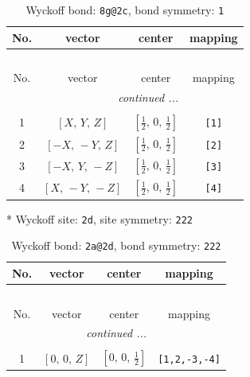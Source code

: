 \documentclass[fleqn,8pt]{jsarticle}
\begin{document}
\begin{longtable}{cccc}
\caption{Wyckoff bond: {\tt 8g@2c}, bond symmetry: {\tt 1}}
 \\
 \hline \hline
No. & vector & center & mapping \\ \hline \endfirsthead

\multicolumn{3}{l}{\tablename\ \thetable{}} \\
 \hline \hline
No. & vector & center & mapping \\ \hline \endhead

 \hline \hline
\multicolumn{3}{r}{\footnotesize\it continued ...} \\ \endfoot

 \hline \hline
\multicolumn{3}{r}{} \\ \endlastfoot

1 & $\left[ X,\, Y,\, Z \right]$ & $\left[ \frac{1}{2},\, 0,\, \frac{1}{2} \right]$ & {\tt [1]} \\ \hline
2 & $\left[ - X,\, - Y,\, Z \right]$ & $\left[ \frac{1}{2},\, 0,\, \frac{1}{2} \right]$ & {\tt [2]} \\ \hline
3 & $\left[ - X,\, Y,\, - Z \right]$ & $\left[ \frac{1}{2},\, 0,\, \frac{1}{2} \right]$ & {\tt [3]} \\ \hline
4 & $\left[ X,\, - Y,\, - Z \right]$ & $\left[ \frac{1}{2},\, 0,\, \frac{1}{2} \right]$ & {\tt [4]} \\
\end{longtable}
* Wyckoff site: {\tt 2d}, site symmetry: {\tt 222}
\renewcommand{\arraystretch}{1.2}
\begin{longtable}{cccc}
\caption{Wyckoff bond: {\tt 2a@2d}, bond symmetry: {\tt 222}}
 \\
 \hline \hline
No. & vector & center & mapping \\ \hline \endfirsthead

\multicolumn{3}{l}{\tablename\ \thetable{}} \\
 \hline \hline
No. & vector & center & mapping \\ \hline \endhead

 \hline \hline
\multicolumn{3}{r}{\footnotesize\it continued ...} \\ \endfoot

 \hline \hline
\multicolumn{3}{r}{} \\ \endlastfoot

1 & $\left[ 0,\, 0,\, Z \right]$ & $\left[ 0,\, 0,\, \frac{1}{2} \right]$ & {\tt [1,2,-3,-4]} \\
\end{longtable}
\end{document}
